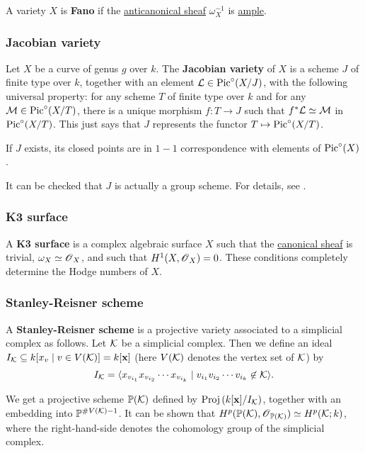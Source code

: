 \documentclass[11pt, english]{article}
\begin{document}
A variety $X$ is \textbf{Fano} if the \hyperref[anticanonical]{anticanonical  sheaf} $\omega_X^{-1}$ is \hyperref[amplelinebundle]{ample}.  

\subsubsection{Jacobian variety}
\label{jacobianvariety}

Let $X$ be a curve of genus $g$ over $k$. The \textbf{Jacobian variety} of $X$ is a scheme $J$ of finite type over $k$, together with an element $\mathcal{L} \in \operatorname{Pic}^\circ(X/J)$, with the following universal property: for any scheme $T$ of finite type over $k$ and for any $\mathcal M \in \operatorname{Pic}^\circ(X/T)$, there is a unique morphism $f:T \to J$ such that $f^\ast \mathcal{L} \simeq \mathcal M$ in $\operatorname{Pic}^\circ (X/T)$. This just says that $J$ represents the functor $T \mapsto \operatorname{Pic}^\circ(X/T)$. 

If $J$ exists, its closed points are in $1-1$ correspondence with elements of $\operatorname{Pic}^\circ (X)$.

It can be checked that $J$ is actually a group scheme. For details, see \cite[Ch. IV.4]{hartshorne}.

\subsubsection{K3 surface}
\label{k3}

A \textbf{K3 surface} is a complex algebraic surface $X$ such that the \hyperref[canonicaldivisor]{canonical sheaf} is trivial, $\omega_X \simeq \operatorname{\mathscr{O}}_X$, and such that $H^1(X,\operatorname{\mathscr{O}}_X)=0$. These conditions completely determine the Hodge numbers of $X$.

\subsubsection{Stanley-Reisner scheme}
\label{srscheme}

A \textbf{Stanley-Reisner scheme} is a projective variety associated to a simplicial complex as follows. Let $\mathcal K$ be a simplicial complex. Then we define an ideal $I_\mathcal K \subseteq k[x_v \mid v \in V(\mathcal K)] = k[\mathbf x]$ (here $V(\mathcal K)$ denotes the vertex set of $\mathcal K$) by
\[
I_\mathcal K = \langle x_{v_{i_1}}x_{v_{i_2}}\cdots x_{v_{i_k}} \mid v_{i_1}v_{i_2}\cdots v_{i_k} \not \in \mathcal K \rangle.
\]

We get a projective scheme $\mathbb{P}(\mathcal K)$ defined by $\operatorname{Proj} \left (k[ \mathbf x]/I_\mathcal K \right)$, together with an embedding into $\mathbb{P}^{\# V(\mathcal K)-1}$. It can be shown that $H^p(\mathbb{P}(\mathcal K),\operatorname{\mathscr{O}}_{\mathbb{P}(\mathcal K)}) \simeq H^p(\mathcal K;k)$, where the right-hand-side denotes the cohomology group of the simplicial complex.
\end{document}
